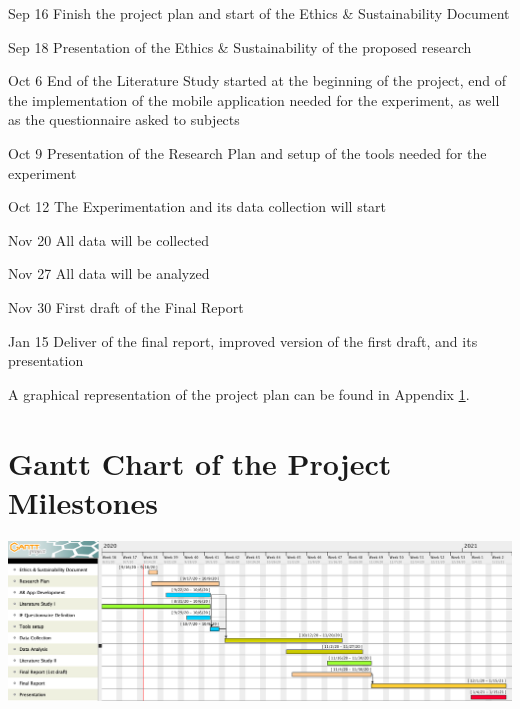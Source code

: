\documentclass[12pt,twoside,english]{article}
\begin{document}
\begin{description}
\item{Sep 16} Finish the project plan and start of the Ethics \& Sustainability Document

\item {Sep 18} Presentation of the Ethics \& Sustainability of the proposed research

\item {Oct 6} End of the Literature Study started at the beginning of the project, end of the implementation of the mobile application needed for the experiment, as well as the questionnaire asked to subjects

\item {Oct 9} Presentation of the Research Plan and setup of the tools needed for the experiment

\item {Oct 12} The Experimentation and its data collection will start

\item {Nov 20} All data will be collected

\item {Nov 27} All data will be analyzed

\item {Nov 30} First draft of the Final Report

\item {Jan 15} Deliver of the final report, improved version of the first draft, and its presentation

\end{description}

A graphical representation of the project plan can be found in Appendix \ref{sect:gantt_chart}.




\appendix
\section{Gantt Chart of the Project Milestones}
\label{sect:gantt_chart}

\includegraphics[width=\textwidth]{imgs/project_milestones}
\end{document}

